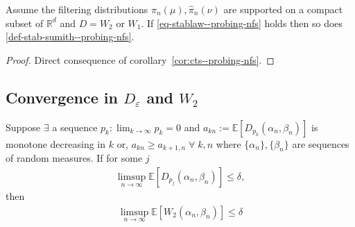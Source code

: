 \begin{thm} Assume the filtering distributions $\hat\pi_n(\mu),\hat\pi_n(\nu)$ are supported on a compact subset of $\mathbb R^d$ and $D=W_2$ or $W_1$. If \eqref{eq-stablaw--probing-nfs} holds then so does \eqref{def-stab-sumith--probing-nfs}.
\begin{proof}
Direct consequence of corollary~\ref{cor:cts--probing-nfs}.
\end{proof}
\label{thm:strength--probing-nfs}
\end{thm}
{\color{mypink}\subsection{Convergence in $D_\varepsilon$ and $W_2$}\label{ssec-dw--probing-nfs}
\begin{thm} Suppose 
$\exists$ a sequence $p_k: \lim_{k\to\infty}p_k=0$ and $  a_{kn}:=\mathbb E[D_{p_k}(\alpha_n, \beta_n)]$ is monotone decreasing in $k$ or, 
$a_{kn} \ge a_{k+1,  n}\;\forall\; k, n$ where $\{\alpha_n\}, \{\beta_n\}$ are sequences of random measures. If for some $j$
\begin{align}
    \limsup_{n\to\infty}\mathbb E[D_{p_j}(\alpha_n, \beta_n)] \le \delta,
\end{align}
then
\begin{align}\limsup_{n\to\infty}\mathbb E[W_2 (\alpha_n, \beta_n)]\le\delta
\end{align}


\end{thm}}
